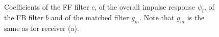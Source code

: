 \documentclass[a4paper, 12pt]{report}
\begin{document}
\begin{figure}[H]
	\centering
	\quad
	\caption{Coefficients of the FF filter $c$, of the overall impulse response $\psi_i$, of the FB filter $b$ and of the matched filter $g_m$. Note that $g_m$ is the same as for receiver (a).}\label{filters_b}
\end{figure}
\end{document}
